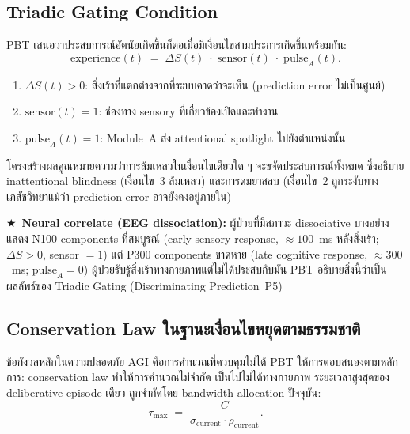 \documentclass[12pt,a4paper]{article}
\newcommand{\starred}{\textbf{\textcolor{pbtblue}{$\bigstar$}}~}
\begin{document}
\subsection{Triadic Gating Condition}

PBT เสนอว่าประสบการณ์อัตนัยเกิดขึ้นก็ต่อเมื่อมีเงื่อนไขสามประการเกิดขึ้นพร้อมกัน:
\begin{equation}
  \mathrm{experience}(t)
  \;=\; \Delta S(t)\;\cdot\;\mathrm{sensor}(t)\;\cdot\;\mathrm{pulse}_A(t).
  \label{eq:triadic}
\end{equation}

\begin{enumerate}[leftmargin=1.8em]
  \item $\Delta S(t) > 0$: สิ่งเร้าที่แตกต่างจากที่ระบบคาดว่าจะเห็น (prediction error ไม่เป็นศูนย์)
  \item $\mathrm{sensor}(t) = 1$: ช่องทาง sensory ที่เกี่ยวข้องเปิดและทำงาน
  \item $\mathrm{pulse}_A(t) = 1$: Module~A ส่ง attentional spotlight ไปยังตำแหน่งนั้น
\end{enumerate}

โครงสร้างผลคูณหมายความว่าการล้มเหลวในเงื่อนไขเดียวใด ๆ
จะขจัดประสบการณ์ทั้งหมด
ซึ่งอธิบาย inattentional blindness (เงื่อนไข~3 ล้มเหลว)
และการดมยาสลบ (เงื่อนไข~2 ถูกระงับทางเภสัชวิทยาแม้ว่า prediction error
อาจยังคงอยู่ภายใน)

\starred\textbf{Neural correlate (EEG dissociation):} ผู้ป่วยที่มีสภาวะ
dissociative บางอย่างแสดง N100 components ที่สมบูรณ์ (early sensory response,
$\approx 100$~ms หลังสิ่งเร้า; $\Delta S > 0$, sensor $= 1$)
แต่ P300 components ขาดหาย (late cognitive response, $\approx 300$~ms;
$\mathrm{pulse}_A = 0$)
ผู้ป่วยรับรู้สิ่งเร้าทางกายภาพแต่ไม่ได้ประสบกับมัน
PBT อธิบายสิ่งนี้ว่าเป็นผลลัพธ์ของ Triadic Gating (Discriminating Prediction~P5)

\subsection{Conservation Law ในฐานะเงื่อนไขหยุดตามธรรมชาติ}

ข้อกังวลหลักในความปลอดภัย AGI คือการคำนวณที่ควบคุมไม่ได้
PBT ให้การตอบสนองตามหลักการ: conservation law ทำให้การคำนวณไม่จำกัด
เป็นไปไม่ได้ทางกายภาพ ระยะเวลาสูงสุดของ deliberative episode เดียว
ถูกจำกัดโดย bandwidth allocation ปัจจุบัน:
\begin{equation}
  \tau_{\max} \;=\; \frac{C}{\sigma_{\mathrm{current}}\cdot\rho_{\mathrm{current}}}.
  \label{eq:halting}
\end{equation}
\end{document}
